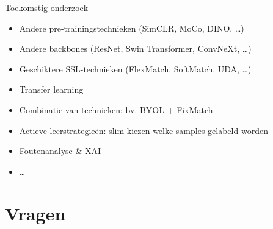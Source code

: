 \documentclass[aspectratio=169]{beamer}
\begin{document}
    \begin{frame}{Toekomstig onderzoek}
        \begin{itemize}
            \item Andere pre-trainingstechnieken (SimCLR, MoCo, DINO, \dots)
            \item Andere backbones (ResNet, Swin Transformer, ConvNeXt, \dots)
            \item Geschiktere SSL-technieken (FlexMatch, SoftMatch, UDA, \dots)
            \item Transfer learning
            \item Combinatie van technieken: bv. BYOL + FixMatch
            \item Actieve leerstrategieën: slim kiezen welke samples gelabeld worden
            \item Foutenanalyse \& XAI
            \item \dots
        \end{itemize}
    \end{frame}
    
    \section{Vragen}
    
    \begin{frame}{}
        \titlepage
    \end{frame}
\end{document}
